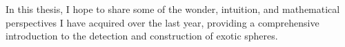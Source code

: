 In this thesis, I hope to share some of the wonder, intuition, and mathematical perspectives I have acquired over the last year, providing a comprehensive introduction to the detection and construction of exotic spheres. 


%





%
